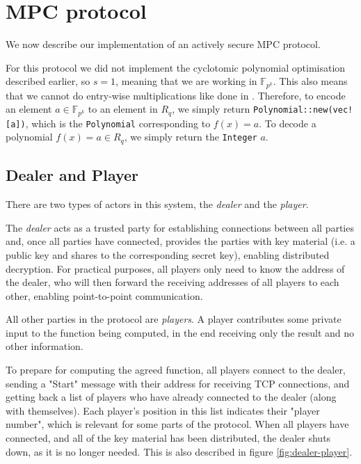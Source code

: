 \documentclass[../main.tex]{subfiles}
\begin{document}
\section{MPC protocol}
We now describe our implementation of an actively secure MPC protocol.

For this protocol we did not implement the cyclotomic polynomial optimisation described earlier, so $s = 1$, meaning that we are working in $\mathbb{F}_{p^k}$.
This also means that we cannot do entry-wise multiplications like done in \cite{damgaard2012multiparty}.
Therefore, to encode an element $a \in \mathbb{F}_{p^k}$ to an element in $R_q$, we simply return \lstinline{Polynomial::new(vec![a])}, which is the \lstinline{Polynomial} corresponding to $f(x) = a$. To decode a polynomial $f(x) = a \in R_q$, we simply return the \lstinline{Integer} $a$.

\subsection{Dealer and Player}

There are two types of actors in this system, the \textit{dealer} and the \textit{player}.

The \textit{dealer} acts as a trusted party for establishing connections between all parties and, once all parties have connected, provides the parties with key material (i.e. a public key and shares to the corresponding secret key), enabling distributed decryption.
For practical purposes, all players only need to know the address of the dealer, who will then forward the receiving addresses of all players to each other, enabling point-to-point communication.

All other parties in the protocol are \textit{players}.
A player contributes some private input to the function being computed, in the end receiving only the result and no other information.

To prepare for computing the agreed function, all players connect to the dealer, sending a "Start" message with their address for receiving TCP connections, and getting back a list of players who have already connected to the dealer (along with themselves).
Each player's position in this list indicates their "player number", which is relevant for some parts of the protocol.
When all players have connected, and all of the key material has been distributed, the dealer shuts down, as it is no longer needed.
This is also described in figure \ref{fig:dealer-player}.
\end{document}
